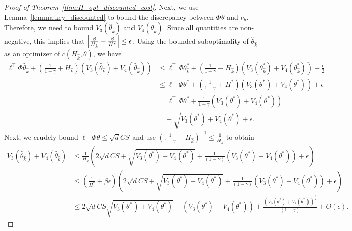 \documentclass[11pt]{article}
\begin{document}
\begin{proof}[Proof of Theorem~\ref{thm:H_opt_discounted_cost}]
Next, we use Lemma~\ref{lemma:key_discounted} to bound the discrepancy between $\Phi\theta$ and $\nu_\theta$. Therefore, we need to bound $V_3(\widehat\theta_{\hat k})$ and $V_4(\widehat\theta_{\hat k})$. Since all quantities are non-negative, this implies that $\left\vert\frac{\beta}{H_{\hat k}} - \frac{\beta}{H^*}\right\vert\leq\epsilon$.
Using the bounded suboptimality of $\widehat\theta_{\hat k}$ as an optimizer of $c(H_{\hat k},\theta)$, we have
\begin{align*}
  \ell^\top\Phi\widehat\theta_{\hat k}
  +\left(\frac{1}{1-\gamma} +  H_{\hat k}\right)\left(V_3(\widehat\theta_{\hat k}) + V_4(\widehat\theta_{\hat k})\right)
  &\leq
  \ell^\top\Phi\theta^*_{\hat k}
  + \left(\frac{1}{1-\gamma} +  H_{\hat k}\right)\left(V_3(\theta^*_{\hat k}) + V_4(\theta^*_{\hat k})\right)+ \frac{\epsilon}{2}\\
  & \leq
  \ell^\top\Phi\theta^*
  + \left(\frac{1}{1-\gamma} +  H^*\right)\left(V_3(\theta^*) + V_4(\theta^*)\right)+ \epsilon\\
&=
  \ell^\top\Phi\theta^*
  + \frac{1}{1-\gamma}\left(V_3(\theta^*) + V_4(\theta^*)\right)\\
&\quad +  \sqrt{V_3(\theta^*) + V_4(\theta^*)}+ \epsilon.
\end{align*}
Next, we crudely bound $\ell^\top\Phi\theta\leq \sqrt{d}CS$ and use  $\left(\frac{1}{1-\gamma} + H_{\hat k}\right)^{-1}\leq
\frac{1}{H_{\hat k}}$ to obtain
\begin{align*}
  V_3(\widehat\theta_{\hat k})+ V_4(\widehat\theta_{\hat k})
  &\leq
    \frac{1}{H_{\hat k}}
    \left(
    2\sqrt{d}CS + \sqrt{V_3(\theta^*) + V_4(\theta^*)}
    +\frac{1}{(1-\gamma)}\left(V_3(\theta^*) + V_4(\theta^*)\right)
    +\epsilon\right)\\
  &\leq
\left(\frac{1}{H^*}+\beta\epsilon\right)
    \left(
    2\sqrt{d}CS + \sqrt{V_3(\theta^*) + V_4(\theta^*)}
    +\frac{1}{(1-\gamma)}\left(V_3(\theta^*) + V_4(\theta^*)\right)
    +\epsilon\right)\\
  &\leq
2\sqrt{d}CS\sqrt{V_3(\theta^*) + V_4(\theta^*)}
    + \left(V_3(\theta^*) + V_4(\theta^*)\right)
    +\frac{\left(V_3(\theta^*) + V_4(\theta^*)\right)^{\frac{3}{2}}}{(1-\gamma)}
+ O(\epsilon).
\end{align*}


\end{proof}
\end{document}
